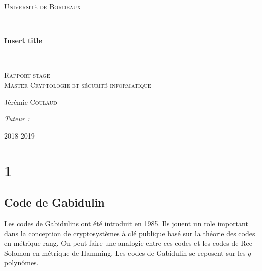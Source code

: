 \documentclass[12pt]{article}
\title{}
\author{Jérémie Coulaud}
\newcommand{\HRule}{\rule{\linewidth}{0.5mm}}
\begin{document}
\newtheorem{prop}{Proposition}
\newtheorem{defi}{Définition}
\newtheorem{thm}{Théorème}
\begin{titlepage}

\begin{center}
\textsc{\LARGE Université de Bordeaux} \\[2.0cm]

\vspace{3cm}
    \HRule \\[0.4cm]
    { \huge \bfseries Insert title\\[0.4cm] }
 \HRule \\[2cm]
 
 \textsc{\large Rapport stage} \\[1.5cm]
 \textsc{\large Master Cryptologie et sécurité informatique} \\[1.5cm]
 \vspace{4cm}
    \begin{minipage}{0.4\textwidth}
      \begin{flushleft} \large
        Jérémie \textsc{Coulaud}\\
      \end{flushleft}
    \end{minipage}
    \begin{minipage}{0.4\textwidth}
      \begin{flushright} \large
        \emph{Tuteur :}  \textsc{}\\
      \end{flushright}
    \end{minipage}

 \vfill
    {\large 2018-2019}
\end{center}
\end{titlepage}
\newpage
\tableofcontents
\newpage
\section{1}


\subsection{Code de Gabidulin}
Les codes de Gabidulins ont été introduit en 1985. Ils jouent un role important dans la conception de cryptosystèmes à clé publique basé sur la théorie des codes en métrique rang. On peut faire une analogie entre ces codes et les codes de Ree-Solomon en métrique de Hamming. Les codes de Gabidulin se reposent sur les $q$-polynômes. 
\end{document}
